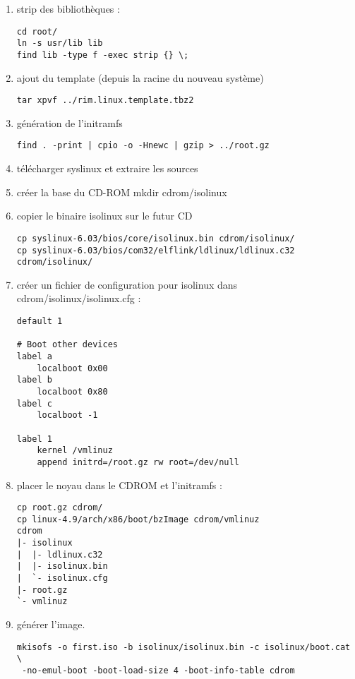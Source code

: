 \documentclass[11pt]{article}
\begin{document}
\begin{solution}
\begin{enumerate}
  \item strip des bibliothèques : 
\begin{verbatim}
cd root/
ln -s usr/lib lib
find lib -type f -exec strip {} \;
\end{verbatim}
  \item ajout du template (depuis la racine du nouveau système)
\begin{verbatim}
tar xpvf ../rim.linux.template.tbz2
\end{verbatim}
  \item génération de l'initramfs
\begin{verbatim}
find . -print | cpio -o -Hnewc | gzip > ../root.gz
\end{verbatim}
  \item télécharger syslinux et extraire les sources
  \item créer la base du CD-ROM mkdir cdrom/isolinux
  \item copier le binaire isolinux sur le futur CD 
\begin{verbatim}
cp syslinux-6.03/bios/core/isolinux.bin cdrom/isolinux/
cp syslinux-6.03/bios/com32/elflink/ldlinux/ldlinux.c32 cdrom/isolinux/
\end{verbatim}
  \item créer un fichier de configuration pour isolinux dans cdrom/isolinux/isolinux.cfg :
\begin{verbatim}
default 1

# Boot other devices
label a
    localboot 0x00
label b
    localboot 0x80
label c
    localboot -1

label 1
    kernel /vmlinuz
    append initrd=/root.gz rw root=/dev/null
\end{verbatim}
  \item placer le noyau dans le CDROM et l'initramfs :
\begin{verbatim}
cp root.gz cdrom/
cp linux-4.9/arch/x86/boot/bzImage cdrom/vmlinuz
cdrom
|- isolinux
|  |- ldlinux.c32
|  |- isolinux.bin
|  `- isolinux.cfg
|- root.gz
`- vmlinuz
\end{verbatim}
  \item générer l'image.
\begin{verbatim}
mkisofs -o first.iso -b isolinux/isolinux.bin -c isolinux/boot.cat \
 -no-emul-boot -boot-load-size 4 -boot-info-table cdrom
\end{verbatim}

 \end{enumerate}

\end{solution}
\end{document}

